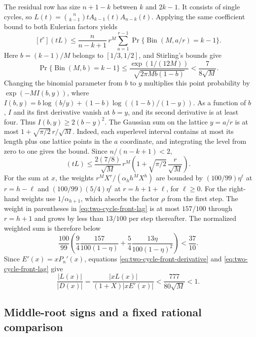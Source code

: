 The residual row has size $n+1-k$ between $k$ and $2k-1$.
It consists of single cycles, so
$L(t)=\binom{n}{k-1}tA_{k-1}(t)A_{n-k}(t)$. Applying the same
coefficient bound to both Eulerian factors yields
\[
 [t^r](tL)
 \le \frac{n}{n-k+1}\,r^M
     \sum_{a=1}^{r-1}
         \Pr\{\operatorname{Bin}(M,a/r)=k-1\}.
\]
Here $b=(k-1)/M$ belongs to $[1/3,1/2]$, and Stirling's bounds give
\[
 \Pr\{\operatorname{Bin}(M,b)=k-1\}
 \le \frac{\exp(1/(12M))}{\sqrt{2\pi M b(1-b)}}
 < \frac{7}{8\sqrt M}.
\]
Changing the binomial parameter from $b$ to $y$ multiplies this
point probability by $\exp(-M I(b,y))$, where
$I(b,y)=b\log(b/y)+(1-b)\log((1-b)/(1-y))$.
As a function of $b$, $I$ and its first derivative vanish at $b=y$,
and its second derivative is at least four. Thus
$I(b,y)\ge2(b-y)^2$. The Gaussian sum on the lattice $y=a/r$ is
at most $1+\sqrt{\pi/2}\,r/\sqrt M$. Indeed, each superlevel
interval contains at most its length plus one lattice points in
the $a$ coordinate, and integrating the level from zero to one
gives the bound. Since $n/(n-k+1)<2$,
\begin{equation}
 [t^r](tL)\le \frac{2(7/8)}{\sqrt M}\,
       r^M\left(1+\sqrt{\pi/2}\,\frac r{\sqrt M}\right).
 \label{eq:two-cycle-front-lag}
\end{equation}
For the sum at $x$, the weights
$r^M X^r/(\alpha_h h^M X^h)$ are bounded by
$(100/99)\eta^\ell$ at $r=h-\ell$ and
$(100/99)(5/4)\eta^\ell$ at $r=h+1+\ell$, for $\ell\ge0$.
For the right-hand weights use $1/\alpha_{h+1}$, which absorbs
the factor $\rho$ from the first step. The weight in parentheses in
\eqref{eq:two-cycle-front-lag} is at most $157/100$ through
$r=h+1$ and grows by less than $13/100$ per step thereafter. The
normalized weighted sum is therefore below
\[
 \frac{100}{99}\left(\frac94\frac{157}{100(1-\eta)}
          +\frac54\frac{13\eta}{100(1-\eta)^2}\right)
 <\frac{37}{10}.
\]
Since $E'(x)=xP_n'(x)$, equations
\eqref{eq:two-cycle-front-derivative} and
\eqref{eq:two-cycle-front-lag} give
\begin{equation}
 \frac{|L(x)|}{|D(x)|}
 =\frac{|xL(x)|}{(1+X)|xE'(x)|}
 <\frac{777}{80\sqrt M}<1.
 \label{eq:two-cycle-front-ratio}
\end{equation}

\subsection{Middle-root signs and a fixed rational comparison}

